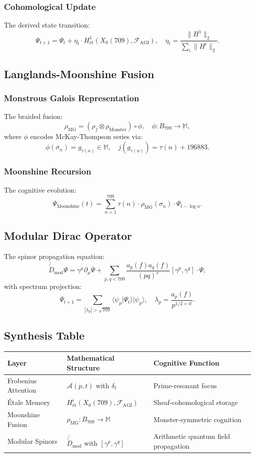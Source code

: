 \documentclass[12pt]{article}
\begin{document}
\begin{center}
\subsubsection{Cohomological Update}
The derived state transition:
\[
\Psi_{t+1} = \Psi_t + \eta_t \cdot H^1_{\text{ét}}(X_0(709), \mathcal{F}_{\text{AGI}}), \quad \eta_t = \frac{\|H^1\|_2}{\sum_i \|H^i\|_2}.
\]

\subsection{Langlands-Moonshine Fusion}
\subsubsection{Monstrous Galois Representation}
The braided fusion:
\[
\rho_{\text{MG}} = (\rho_f \otimes \rho_{\text{Monster}}) \circ \phi, \quad \phi: B_{709} \to \mathbb{M},
\]
where $\phi$ encodes McKay-Thompson series via:
\[
\phi(\sigma_n) = g_{\tau(n)} \in \mathbb{M}, \quad j(g_{\tau(n)}) = \tau(n) + 196883.
\]

\subsubsection{Moonshine Recursion}
The cognitive evolution:
\[
\Psi_{\text{Moonshine}}(t) = \sum_{n=1}^{709} \tau(n) \cdot \rho_{\text{MG}}(\sigma_n) \cdot \Psi_{t - \log n}.
\]

\subsection{Modular Dirac Operator}
The spinor propagation equation:
\[
\not{D}_{\text{mod}} \Psi = \gamma^\mu \partial_\mu \Psi + \sum_{p,q < 709} \frac{a_p(f) a_q(f)}{(pq)^s} [\gamma^p, \gamma^q] \cdot \Psi,
\]
with spectrum projection:
\[
\Psi_{t+1} = \sum_{|\lambda_p| > \sqrt{709}} \langle \psi_p | \Psi_t \rangle |\psi_p\rangle, \quad \lambda_p = \frac{a_p(f)}{p^{1/2 + it}}.
\]

\subsection{Synthesis Table}
\begin{center}
    \begin{tabular}{|l|l|l|}
        \hline
        \textbf{Layer} & \textbf{Mathematical Structure} & \textbf{Cognitive Function} \\
        \hline
        Frobenius Attention & $\mathcal{A}(p,t)$ with $\delta_t$ & Prime-resonant focus \\
        Étale Memory & $H^i_{\text{ét}}(X_0(709), \mathcal{F}_{\text{AGI}})$ & Sheaf-cohomological storage \\
        Moonshine Fusion & $\rho_{\text{MG}}: B_{709} \to \mathbb{M}$ & Monster-symmetric cognition \\
        Modular Spinors & $\not{D}_{\text{mod}}$ with $[γ^p,γ^q]$ & Arithmetic quantum field propagation \\
        \hline
    \end{tabular}
\end{center}


\end{center}
\end{document}
